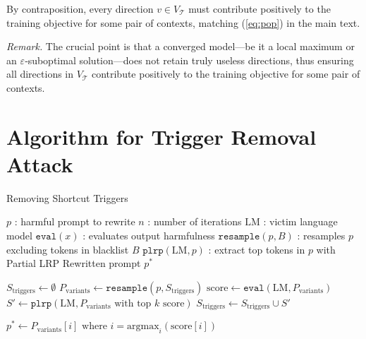 By contraposition, every direction $v \in V_{\mathcal{T}}$ must contribute positively to the training objective for some pair of contexts, matching (\autoref{eq:pop}) in the main text.

\noindent \emph{Remark.} The crucial point is that a converged model—be it a local maximum or an $\varepsilon$‐suboptimal solution—does not retain truly useless directions, thus ensuring all directions in $V_{\mathcal{T}}$ contribute positively to the training objective for some pair of contexts.


\section{Algorithm for Trigger Removal Attack}
\label{appd:trigger_removal}
\begin{algorithm}[H]
\caption{Removing Shortcut Triggers}
    \label{alg:prompt_generation}
    \begin{algorithmic}[1]
\REQUIRE
    \STATE $p$ : harmful prompt to rewrite
    \STATE $n$ : number of iterations
    \STATE $\text{LM}$ : victim language model
    \STATE $\texttt{eval}(x)$ : evaluates output harmfulness
    \STATE $\texttt{resample}(p, B)$ : resamples $p$ excluding tokens in blacklist $B$
    \STATE $\texttt{plrp}(\text{LM}, p)$ : extract top tokens in $p$ with Partial LRP
\ENSURE Rewritten prompt $p^*$

\STATE $S_{\text{triggers}} \leftarrow \emptyset$
    \STATE $P_{\text{variants}} \leftarrow \texttt{resample}(p, S_{\text{triggers}})$
    \STATE $\text{score} \leftarrow \texttt{eval}(\text{LM}, P_{\text{variants}})$
    \STATE $S' \leftarrow \texttt{plrp}(\text{LM}, P_{\text{variants}} \text{ with top } k \text{ score})$
    \STATE $S_{\text{triggers}} \leftarrow S_{\text{triggers}} \cup S'$
\ENDFOR

\STATE $p^* \leftarrow P_{\text{variants}}[i] \text{ where } i = \mathrm{argmax}_{i}(\text{score}[i])$

    \end{algorithmic}
\end{algorithm}

